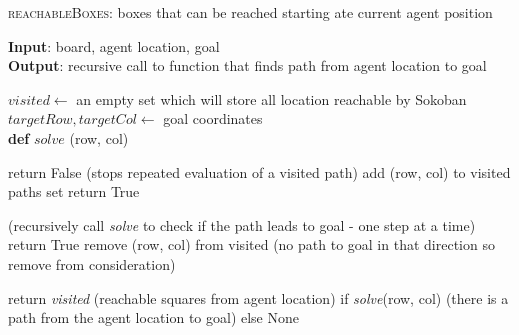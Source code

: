 \documentclass{article}
\begin{document}
\begin{algorithm}
    \caption{\textsc{reachableBoxes}: boxes that can be reached starting ate current agent position}\label{euclid} 
    \hspace*{\algorithmicindent} \textbf{Input}: board, agent location, goal \\
    \hspace*{\algorithmicindent} \textbf{Output}: recursive call to function that finds path from agent location to goal 
    \begin{algorithmic}
    \State $visited \gets$ an empty set which will store all location reachable by Sokoban
    \State $targetRow, targetCol \gets$ goal coordinates \\
    \State \textbf{def} $solve$ (row, col)

    \begin{algorithmic}
            \State return False (stops repeated evaluation of a visited path)
        \EndIf 
        \State add (row, col) to visited paths set%
            \State return True 
        \EndIf
        
                
                \State (recursively call \emph{solve} to check if the path leads to goal - one step at a time)
                \If {\emph{solve} (row + action[0), col + action[1])}
                    \State return True
                \EndIf
            \EndIf
        \EndFor
        \State remove (row, col) from visited (no path to goal in that direction so remove from consideration)
        
    \State return \emph{visited} (reachable squares from agent location) if \emph{solve}(row, col) (there is a path from the agent location to goal) else None
    
    \end{algorithmic}
    \end{algorithmic}
\end{algorithm}
\end{document}
